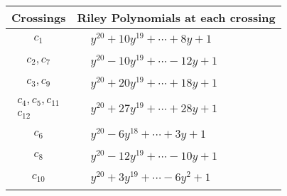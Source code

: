 \documentclass[1p]{elsarticle_modified}
\theoremstyle{definition}
\begin{document}
\begin{tabular}{m{50pt}|m{274pt}}
Crossings & \hspace{64pt}Riley Polynomials at each crossing \\
\hline $$\begin{aligned}c_{1}\end{aligned}$$&$\begin{aligned}
&y^{20}+10 y^{19}+\cdots+8 y+1
\end{aligned}$\\
\hline $$\begin{aligned}c_{2},c_{7}\end{aligned}$$&$\begin{aligned}
&y^{20}-10 y^{19}+\cdots-12 y+1
\end{aligned}$\\
\hline $$\begin{aligned}c_{3},c_{9}\end{aligned}$$&$\begin{aligned}
&y^{20}+20 y^{19}+\cdots+18 y+1
\end{aligned}$\\
\hline $$\begin{aligned}c_{4},c_{5},c_{11}\\c_{12}\end{aligned}$$&$\begin{aligned}
&y^{20}+27 y^{19}+\cdots+28 y+1
\end{aligned}$\\
\hline $$\begin{aligned}c_{6}\end{aligned}$$&$\begin{aligned}
&y^{20}-6 y^{18}+\cdots+3 y+1
\end{aligned}$\\
\hline $$\begin{aligned}c_{8}\end{aligned}$$&$\begin{aligned}
&y^{20}-12 y^{19}+\cdots-10 y+1
\end{aligned}$\\
\hline $$\begin{aligned}c_{10}\end{aligned}$$&$\begin{aligned}
&y^{20}+3 y^{19}+\cdots-6 y^2+1
\end{aligned}$\\
\hline
\end{tabular}\\~\\
\end{document}
